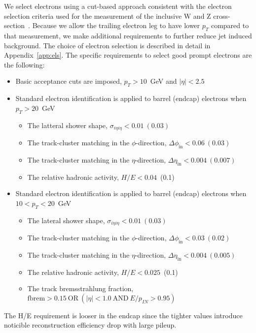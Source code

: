 We select electrons using a cut-based approach consistent with the electron 
selection criteria used for the measurement of the inclusive W and Z 
cross-section~\cite{VBTFCrossSectionNote}. 
Because we allow the trailing electron leg to have lower $p_T$ compared
to that measurement, we make additional requirements to further reduce
jet induced background.
The choice of electron selection is described in detail in Appendix~\ref{app:els}.
The specific requirements to select good prompt electrons are the following:

\begin{itemize}
    \item Basic acceptance cuts are imposed,  $p_T>10$~GeV and $|\eta| < 2.5$
    \item Standard electron identification is applied to barrel (endcap) electrons when $p_T>20$~GeV
    \begin{itemize}
        \item The latteral shower shape, $\sigma_{i\eta i\eta} < 0.01~(0.03)$
        \item The track-cluster matching in the $\phi$-direction, $\Delta \phi_{\mathrm{in}} < 0.06~(0.03)$
        \item The track-cluster matching in the $\eta$-direction, $\Delta \eta_{\mathrm{in}} < 0.004~(0.007)$
        \item The relative hadronic activity, $H/E<0.04$~(0.1)
    \end{itemize}
    \item Standard electron identification is applied to barrel (endcap) electrons when $10<p_T<20$~GeV
    \begin{itemize}
        \item The lateral shower shape, $\sigma_{i\eta i\eta} < 0.01~(0.03)$
        \item The track-cluster matching in the $\phi$-direction, $\Delta \phi_{\mathrm{in}} < 0.03~(0.02)$
        \item The track-cluster matching in the $\eta$-direction, $\Delta \eta_{\mathrm{in}} < 0.004~(0.005)$
        \item The relative hadronic activity, $H/E<0.025$~(0.1)
        \item The track bremsstrahlung fraction, $\mathrm{fbrem}>0.15~\mathrm{OR}~(|\eta|<1.0~\mathrm{AND}~E/p_{IN}>0.95)$
    \end{itemize}
\end{itemize}

The H/E requirement is looser in the endcap since the tighter values
introduce noticible reconstruction efficiency drop with large pileup.

